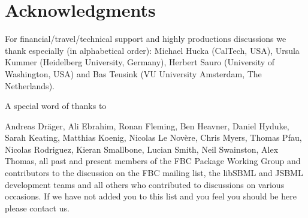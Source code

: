 
\section{Acknowledgments}


For financial/travel/technical support and highly productions discussions we thank especially (in alphabetical order): Michael Hucka (CalTech, USA), Ursula Kummer (Heidelberg University, Germany), Herbert Sauro (University of Washington, USA) and Bas Teusink (VU University Amsterdam, The Netherlands).

A special word of thanks to 

 Andreas Dr\"{a}ger, Ali Ebrahim, Ronan Fleming, Ben Heavner, Daniel Hyduke, Sarah Keating, Matthias Koenig, Nicolas Le Nov\`{e}re, Chris Myers, Thomas Pfau, Nicolas Rodriguez, Kieran Smallbone, Lucian Smith, Neil Swainston, Alex Thomas, all past and present members of the \textsf{FBC Package Working Group} and contributors to the discussion on the \textsf{FBC mailing list}, the libSBML and JSBML development teams and all others who contributed to discussions on various occasions. If we have not added you to this list and you feel you should be here please contact us.

